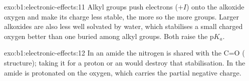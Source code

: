 \begin{solution}{exo:b1:electronic-effects:11}
Alkyl groups push electrons ($+I$) onto the alkoxide oxygen and make its
charge less stable, the more so the more groups. Larger alkoxides are
also less well solvated by water, which stabilises a small charged
oxygen better than one buried among alkyl groups. Both raise the
$\mathrm{p}K_a$.
\end{solution}

\begin{solution}{exo:b1:electronic-effects:12}
In an amide the nitrogen  is shared with the C=O
( structure); taking it for a proton or an  would
destroy that stabilisation. In  the amide is protonated on the
oxygen, which carries the partial negative charge.
\end{solution}

